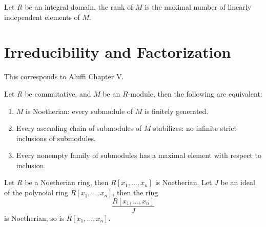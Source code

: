 \documentclass[openany]{book}
\begin{document}
\begin{defn}
    Let $R$ be an integral domain, the rank of $M$ is the maximal number of linearly independent elements of $M$.
\end{defn}




































\chapter{Irreducibility and Factorization}
This corresponds to Aluffi Chapter V.



\begin{prop}
    Let $R$ be commutative, and $M$ be an $R$-module, then the following are equivalent:
    \begin{enumerate}
        \item $M$ is Noetherian: every submodule of $M$ is finitely generated.
        \item Every ascending chain of submodules of $M$ stabilizes: no infinite strict inclusions of submodules.
        \item Every nonempty family of submodules has a maximal element with respect to inclusion.
    \end{enumerate}
\end{prop}


\begin{prop}[*]
    Let $R$ be a Noetherian ring, then $R[x_1,\dots, x_n]$ is Noetherian. Let $J$ be an ideal of the polynoial ring $R[x_1,\dots, x_n]$, then the ring 
    \begin{equation*}
        \frac{R[x_1,\dots,x_n]}{J}
    \end{equation*}
    is Noetherian, so is $R[x_1,\dots, x_n]$.
\end{prop}
\end{document}
